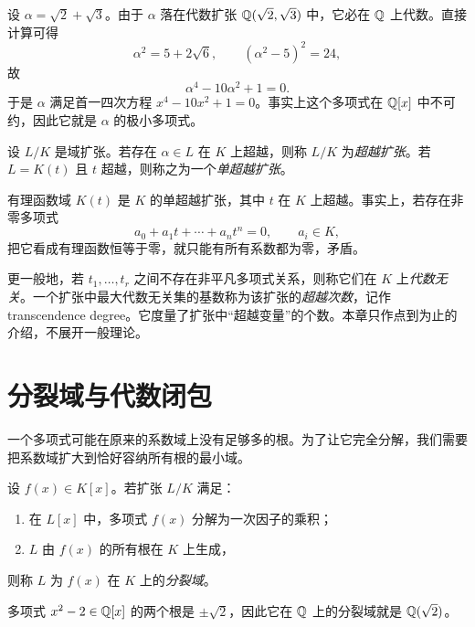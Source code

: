 \begin{example}
设 $\alpha=\sqrt2+\sqrt3$。由于 $\alpha$ 落在代数扩张 $\mathbb{Q}(\sqrt2,\sqrt3)$ 中，它必在 $\mathbb{Q}$ 上代数。直接计算可得
\[
\alpha^2=5+2\sqrt6,
\qquad (\alpha^2-5)^2=24,
\]
故
\[
\alpha^4-10\alpha^2+1=0.
\]
于是 $\alpha$ 满足首一四次方程 $x^4-10x^2+1=0$。事实上这个多项式在 $\mathbb{Q}[x]$ 中不可约，因此它就是 $\alpha$ 的极小多项式。
\end{example}

\begin{definition}
设 $L/K$ 是域扩张。若存在 $\alpha\in L$ 在 $K$ 上超越，则称 $L/K$ 为\emph{超越扩张}。若 $L=K(t)$ 且 $t$ 超越，则称之为一个\emph{单超越扩张}。
\end{definition}

\begin{example}
有理函数域 $K(t)$ 是 $K$ 的单超越扩张，其中 $t$ 在 $K$ 上超越。事实上，若存在非零多项式
\[
a_0+a_1 t+\cdots+a_n t^n=0,\qquad a_i\in K,
\]
把它看成有理函数恒等于零，就只能有所有系数都为零，矛盾。
\end{example}

\begin{remark}
更一般地，若 $t_1,\dots,t_r$ 之间不存在非平凡多项式关系，则称它们在 $K$ 上\emph{代数无关}。一个扩张中最大代数无关集的基数称为该扩张的\emph{超越次数}，记作 transcendence degree。它度量了扩张中“超越变量”的个数。本章只作点到为止的介绍，不展开一般理论。
\end{remark}

\section{分裂域与代数闭包}

一个多项式可能在原来的系数域上没有足够多的根。为了让它完全分解，我们需要把系数域扩大到恰好容纳所有根的最小域。

\begin{definition}
设 $f(x)\in K[x]$。若扩张 $L/K$ 满足：
\begin{enumerate}[label=(\arabic*)]
  \item 在 $L[x]$ 中，多项式 $f(x)$ 分解为一次因子的乘积；
  \item $L$ 由 $f(x)$ 的所有根在 $K$ 上生成，
\end{enumerate}
则称 $L$ 为 $f(x)$ 在 $K$ 上的\emph{分裂域}。
\end{definition}

\begin{example}
多项式 $x^2-2\in\mathbb{Q}[x]$ 的两个根是 $\pm\sqrt2$，因此它在 $\mathbb{Q}$ 上的分裂域就是 $\mathbb{Q}(\sqrt2)$。
\end{example}

